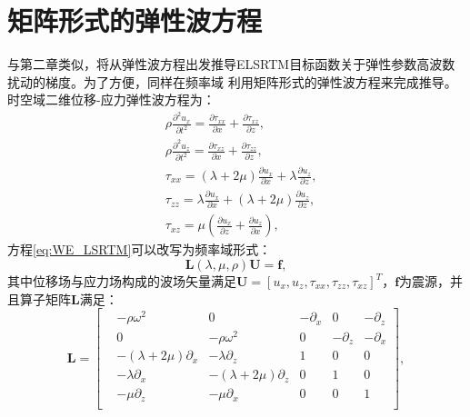 \section{矩阵形式的弹性波方程}
与第二章类似，将从弹性波方程出发推导ELSRTM目标函数关于弹性参数高波数扰动的梯度。为了方便，同样在频率域
利用矩阵形式的弹性波方程来完成推导。时空域二维位移-应力弹性波方程为：
\begin{equation}
\begin{split}
   & \rho\frac{\partial^2 u_{x}}{\partial t^2}=	\frac{\partial \tau_{xx}}{\partial x}+
		\frac{\partial \tau_{xz}}{\partial z},\\
   & \rho\frac{\partial^2 u_{z}}{\partial t^2}=	\frac{\partial \tau_{xz}}{\partial x}+
		\frac{\partial \tau_{zz}}{\partial z},\\
   & \tau_{xx}=(\lambda+2\mu)\frac{\partial u_x}{\partial x}+\lambda\frac{\partial u_z}{\partial z},\\
   & \tau_{zz}=\lambda\frac{\partial u_x}{\partial x}+(\lambda+2\mu)\frac{\partial u_z}{\partial z},\\
   & \tau_{xz}=\mu(\frac{\partial u_x}{\partial z} + \frac{\partial u_z}{\partial x}),
    \label{eq:WE_LSRTM}
\end{split}
\end{equation}
方程\eqref{eq:WE_LSRTM}可以改写为频率域形式：
\begin{equation}
\mathbf{L}(\lambda,\mu,\rho)\mathbf{U}=\mathbf{f},
    \label{eq:WE_Matrix} 
\end{equation}
其中位移场与应力场构成的波场矢量满足$\mathbf{U}=[u_x,u_z,\tau_{xx},\tau_{zz},\tau_{xz}]^T$，$\mathbf{f}$为震源，并且算子矩阵$\mathbf{L}$满足：
\begin{equation}
        \mathbf{L}
        =
        \begin{bmatrix}
			&-\rho\omega^2 &0 &-\partial_x & 0 &-\partial_z\\
			& 0  &-\rho\omega^2 &0 &-\partial_z &-\partial_x\\
			&-(\lambda+2\mu)\partial_x &-\lambda\partial_z &1 &0&0\\
			& -\lambda\partial_x  &-(\lambda+2\mu)\partial_z &0 &1&0\\
			& -\mu\partial_z  &-\mu\partial_x &0 &0&1\\
        \end{bmatrix},
        \label{eq:L}
\end{equation}
